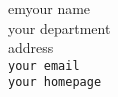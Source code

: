 \documentclass[11pt]{sat}
\def\dword#1{{\bf #1}} \def\eword#1{{\it #1}}
\def\dd{\,{\rm d}}  %
\def\ee{{\rm e}}  %
\def\ii{{\rm i}}  %
\def\floor#1{\lfloor#1\rfloor}
\def\endddoc{\label{endpage}\end{document}}
\begin{document}




{

\bigskip
 em\vbox{\noindent your name\\your department\\address\\
 {\tt your email }\\
{\tt your homepage }}

} 

\endddoc
\def\updated{15jun11}
\end{document}
